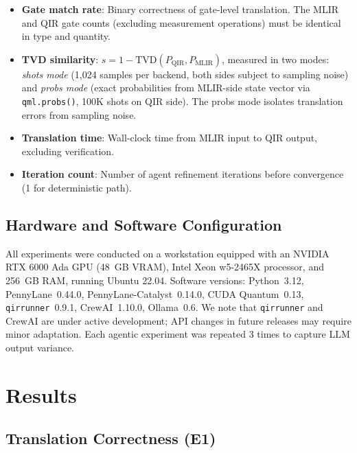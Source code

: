\documentclass[conference]{IEEEtran}
\begin{document}
\begin{itemize}
    \item \textbf{Gate match rate}: Binary correctness of gate-level translation. The MLIR and QIR gate counts (excluding measurement operations) must be identical in type and quantity.
    \item \textbf{TVD similarity}: $s = 1 - \text{TVD}(P_\text{QIR}, P_\text{MLIR})$, measured in two modes: \emph{shots mode} (1,024 samples per backend, both sides subject to sampling noise) and \emph{probs mode} (exact probabilities from MLIR-side state vector via \texttt{qml.probs()}, 100K shots on QIR side). The probs mode isolates translation errors from sampling noise.
    \item \textbf{Translation time}: Wall-clock time from MLIR input to QIR output, excluding verification.
    \item \textbf{Iteration count}: Number of agent refinement iterations before convergence (1 for deterministic path).
\end{itemize}


\subsection{Hardware and Software Configuration}

All experiments were conducted on a workstation equipped with an NVIDIA RTX 6000 Ada GPU (48~GB VRAM), Intel Xeon w5-2465X processor, and 256~GB RAM, running Ubuntu 22.04. Software versions: Python~3.12, PennyLane~0.44.0, PennyLane-Catalyst~0.14.0, CUDA Quantum~0.13, \texttt{qirrunner}~0.9.1, CrewAI~1.10.0, Ollama~0.6. We note that \texttt{qirrunner} and CrewAI are under active development; API changes in future releases may require minor adaptation. Each agentic experiment was repeated 3 times to capture LLM output variance.


\section{Results}\label{sec:results}

\subsection{Translation Correctness (E1)}
\end{document}
